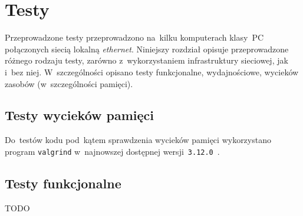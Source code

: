 \documentclass[thesis]{subfiles}
\begin{document}
\chapter{Testy}
\label{chapter:testy}

Przeprowadzone testy przeprowadzono na~kilku komputerach klasy~PC połączonych siecią lokalną \emph{ethernet}. Niniejszy rozdział opisuje przeprowadzone różnego rodzaju testy, zarówno z~wykorzystaniem infrastruktury sieciowej, jak i~bez niej. W~szczególności opisano testy funkcjonalne, wydajnościowe, wycieków zasobów (w~szczególności pamięci).


\section{Testy wycieków pamięci}

Do~testów kodu pod~kątem sprawdzenia wycieków pamięci wykorzystano program \texttt{valgrind} w~najnowszej dostępnej wersji~\texttt{3.12.0}~\cite{valgrind}.

%
%
%

\section{Testy funkcjonalne}

TODO
\end{document}

